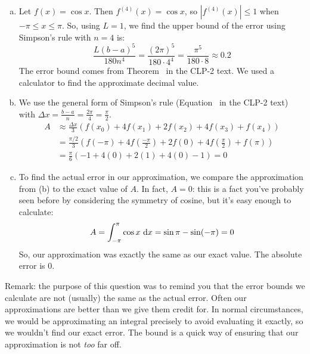 \begin{solution}
\begin{enumerate}[(a)]
\item Let $f(x) = \cos x$. Then $f^{(4)}(x)=\cos x$, so $|f^{(4)}(x)| \leq 1$ when $-\pi \leq x \leq \pi$. So, using $L=1$, we find the upper bound of the error using Simpson's rule with $n=4$ is:
\[\frac{L(b-a)^5}{180 n^4} = \frac{(2\pi)^5}{180\cdot 4^4} = \frac{\pi^5}{180\cdot8}\approx 0.2\]
The error bound comes from Theorem~ in the CLP-2 text.
We used a calculator to find the approximate decimal value.
\item
We use the general form of Simpson's rule (Equation~ in
the CLP-2 text) with $\Delta x = \frac{b-a}{n}=\frac{2\pi}{4} = \frac{\pi}{2}$.
\begin{align*}
A& \approx \frac{\Delta x}{3}\left(f(x_0) + 4f(x_1)+2f(x_2)+4f(x_3)+f(x_4)\right)
\\&=\frac{\pi/2}{3}\left(f(-\pi) + 4f(\tfrac{-\pi}{2})+2f(0)+4f(\tfrac{\pi}{2})+f(\pi)\right)\\
&= \frac{\pi}{6}\left(-1 + 4(0)+2(1)+4(0)-1\right)=0
\end{align*}
\item
To find the actual error in our approximation, we compare the approximation from (b) to the exact value of $A$. In fact, $A=0$: this is a fact you've probably seen before by considering the symmetry of cosine, but it's easy enough to calculate:
\[A = \int_{-\pi}^{\pi} \cos x~\mathrm{d}x= \sin \pi - \sin (-\pi) = 0\]
So, our approximation was exactly the same as our exact value. The absolute error is 0.
\end{enumerate}
Remark: the purpose of this question was to remind you that the error bounds we calculate are not (usually) the same as the actual error. Often our approximations are better than we give them credit for. In normal circumstances, we would be approximating an integral precisely to avoid evaluating it exactly, so we wouldn't find our exact error. The bound is a quick way of ensuring that our approximation is not \emph{too} far off.
\end{solution}

